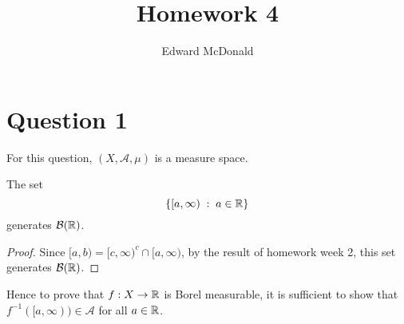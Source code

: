 \documentclass{unswmaths}
\begin{document}
\subject{Measure Theory}
\author{Edward McDonald}
\title{Homework 4}


\setlength\parindent{0pt}


\newcommand{\Bor}{\mathcal{B}(\Rl)}
\newcommand{\sdiff}{\bigtriangleup}

\unswtitle{}


\section*{Question 1}
For this question, $(X,\mathcal{A},\mu)$ is a measure space.
\begin{lemma}
    The set 
    \begin{equation*}
        \{[a,\infty)\;:\;a \in\mathbb{R}\}
    \end{equation*}
    generates $\mathcal{B}(\mathbb{R})$.
\end{lemma}
\begin{proof}
    Since $[a,b) = [c,\infty)^c\cap [a,\infty)$, by the result
    of homework week 2, this set generates $\mathcal{B}(\mathbb{R})$.
\end{proof}
Hence to prove that $f:X\rightarrow\mathbb{R}$ is Borel
measurable, it is sufficient to show that $f^{-1}([a,\infty)) \in \mathcal{A}$
for all $a \in \mathbb{R}$.
\end{document}
